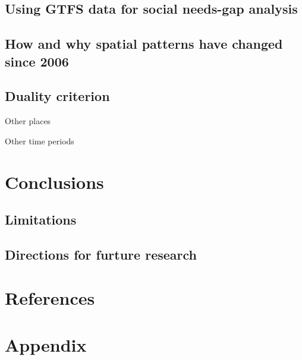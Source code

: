 \documentclass[preprint, 3p,
authoryear]{elsarticle} %
\begin{document}
\subsection{Using GTFS data for social needs-gap
analysis}\label{using-gtfs-data-for-social-needs-gap-analysis}

\subsection{How and why spatial patterns have changed since
2006}\label{how-and-why-spatial-patterns-have-changed-since-2006}

\subsection{Duality criterion}\label{duality-criterion}

Other places

Other time periods

\section{Conclusions}\label{conclusions}

\subsection{Limitations}\label{limitations}

\subsection{Directions for furture
research}\label{directions-for-furture-research}

\section*{References}\label{references}

\section{Appendix}\label{appendix}
\end{document}
